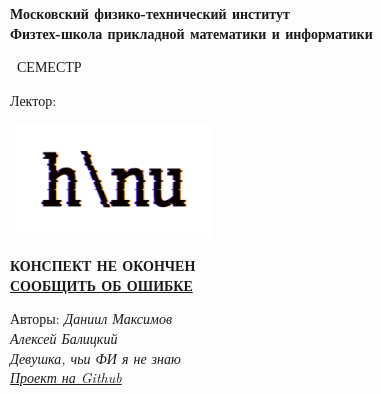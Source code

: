 \begin{titlepage}
	\clearpage\thispagestyle{empty}
	\centering
	
	\textbf{Московский физико-технический институт \\ Физтех-школа прикладной математики и информатики}
	\vspace{33ex}
	
	{\textbf{\FullCourseNameFirstPart}}
	
	\SemesterNumber\ СЕМЕСТР  
	\vspace{1ex}
	
	Лектор: \textit{\LecturerInitials}
	
	\includegraphics[width=0.4\textwidth]{images/logo_ltc.png}
	
	{\large \textbf{КОНСПЕКТ НЕ ОКОНЧЕН}
	\\
	\href{https://docs.google.com/forms/d/e/1FAIpQLSdlFj96AAxhwq3hM0PjiOZ6nvuIHpRIrEMqAPnATpLz4G3-NA/viewform?usp=sf_link}{\textbf{СООБЩИТЬ ОБ ОШИБКЕ}}}

	\begin{flushright}
		\noindent
		Авторы: \textit{Даниил Максимов}
		\\
		\textit{Алексей Балицкий}
		\\
		\textit{Девушка, чьи ФИ я не знаю}
		\\
		\href{\GithubLink}{\textit{Проект на Github}}
	\end{flushright}
	
	\vfill
	\CourseDate
	\pagebreak
\end{titlepage}
